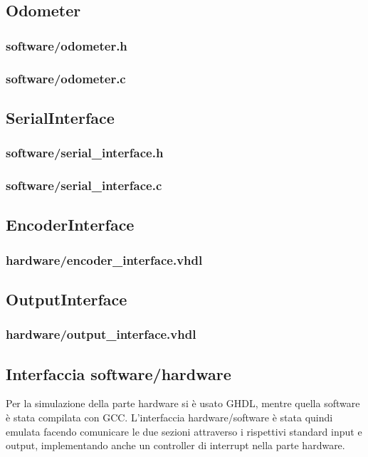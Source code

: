 \documentclass [11pt,a4paper,oneside]{paper}
\newcommand{\inputVHDL}[1]{}
\newcommand{\inputC}[1]{}
\begin{document}
\subsection{Odometer}
\subsubsection{software/odometer.h}
\inputC{software/odometer.h}
\subsubsection{software/odometer.c}
\inputC{software/odometer.c}

\subsection{SerialInterface}
\subsubsection{software/serial\_interface.h}
\inputC{software/serial_interface.h}
\subsubsection{software/serial\_interface.c}
\inputC{software/serial_interface.c}

\subsection{EncoderInterface}
\subsubsection{hardware/encoder\_interface.vhdl}
\inputVHDL{hardware/encoder_interface.vhdl}

\subsection{OutputInterface}
\subsubsection{hardware/output\_interface.vhdl}
\inputVHDL{hardware/output_interface.vhdl}

\subsection{Interfaccia software/hardware}
Per la simulazione della parte hardware si è usato GHDL, mentre quella software
è stata compilata con GCC. L'interfaccia hardware/software è stata quindi emulata
facendo comunicare le due sezioni attraverso i rispettivi standard input e output,
implementando anche un controller di interrupt nella parte hardware.
\end{document}
